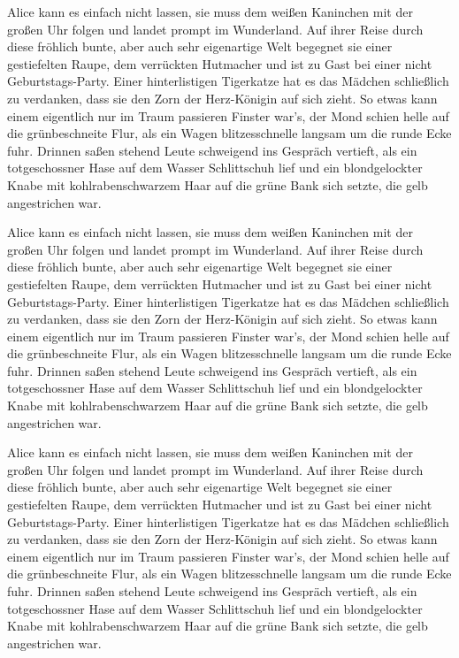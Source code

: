 Alice kann es einfach nicht lassen, sie muss dem weißen Kaninchen mit der großen Uhr folgen und landet prompt im Wunderland. Auf ihrer Reise durch diese fröhlich bunte, aber auch sehr eigenartige Welt begegnet sie einer gestiefelten Raupe, dem verrückten Hutmacher und ist zu Gast bei einer nicht Geburtstags-Party. Einer hinterlistigen Tigerkatze hat es das Mädchen schließlich zu verdanken, dass sie den Zorn der Herz-Königin auf sich zieht. So etwas kann einem eigentlich nur im Traum passieren
Finster war's, der Mond schien helle auf die grünbeschneite Flur, als
ein Wagen blitzesschnelle langsam um die runde Ecke fuhr. Drinnen
saßen stehend Leute schweigend ins Gespräch vertieft, als ein
totgeschossner Hase auf dem Wasser Schlittschuh lief und ein
blondgelockter Knabe mit kohlrabenschwarzem Haar auf die grüne Bank
sich setzte, die gelb angestrichen war.

Alice kann es einfach nicht lassen, sie muss dem weißen Kaninchen mit der großen Uhr folgen und landet prompt im Wunderland. Auf ihrer Reise durch diese fröhlich bunte, aber auch sehr eigenartige Welt begegnet sie einer gestiefelten Raupe, dem verrückten Hutmacher und ist zu Gast bei einer nicht Geburtstags-Party. Einer hinterlistigen Tigerkatze hat es das Mädchen schließlich zu verdanken, dass sie den Zorn der Herz-Königin auf sich zieht. So etwas kann einem eigentlich nur im Traum passieren
Finster war's, der Mond schien helle auf die grünbeschneite Flur, als
ein Wagen blitzesschnelle langsam um die runde Ecke fuhr. Drinnen
saßen stehend Leute schweigend ins Gespräch vertieft, als ein
totgeschossner Hase auf dem Wasser Schlittschuh lief und ein
blondgelockter Knabe mit kohlrabenschwarzem Haar auf die grüne Bank
sich setzte, die gelb angestrichen war.

Alice kann es einfach nicht lassen, sie muss dem weißen Kaninchen mit der großen Uhr folgen und landet prompt im Wunderland. Auf ihrer Reise durch diese fröhlich bunte, aber auch sehr eigenartige Welt begegnet sie einer gestiefelten Raupe, dem verrückten Hutmacher und ist zu Gast bei einer nicht Geburtstags-Party. Einer hinterlistigen Tigerkatze hat es das Mädchen schließlich zu verdanken, dass sie den Zorn der Herz-Königin auf sich zieht. So etwas kann einem eigentlich nur im Traum passieren
Finster war's, der Mond schien helle auf die grünbeschneite Flur, als
ein Wagen blitzesschnelle langsam um die runde Ecke fuhr. Drinnen
saßen stehend Leute schweigend ins Gespräch vertieft, als ein
totgeschossner Hase auf dem Wasser Schlittschuh lief und ein
blondgelockter Knabe mit kohlrabenschwarzem Haar auf die grüne Bank
sich setzte, die gelb angestrichen war.

